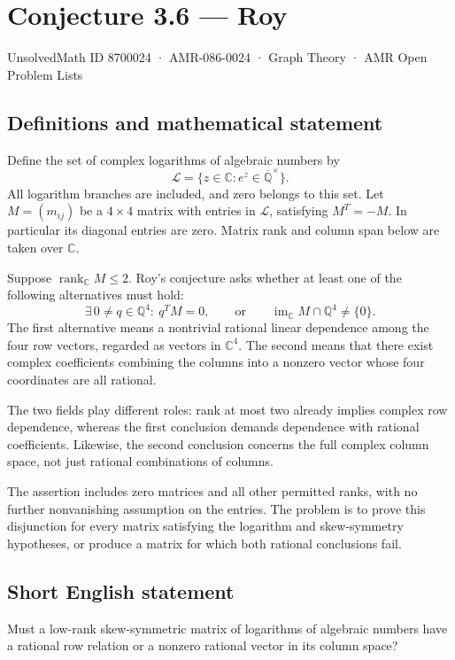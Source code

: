 \documentclass[11pt,a4paper]{article}
\begin{document}
\section*{Conjecture 3.6 — Roy}\label{8700024}
{\small UnsolvedMath ID 8700024 · AMR-086-0024 · Graph Theory · AMR Open Problem Lists}
\subsection{Definitions and mathematical statement}
Define the set of complex logarithms of algebraic numbers by
\[
\mathcal L=\{z\in\mathbb C:e^z\in\overline{\mathbb Q}^{\times}\}.
\]
All logarithm branches are included, and zero belongs to this set. Let $M=(m_{ij})$ be a $4\times4$ matrix with entries in $\mathcal L$, satisfying $M^T=-M$. In particular its diagonal entries are zero. Matrix rank and column span below are taken over $\mathbb C$.

Suppose $\operatorname{rank}_{\mathbb C}M\le2$. Roy's conjecture asks whether at least one of the following alternatives must hold:
\[
\exists\,0\ne q\in\mathbb Q^4:\ q^TM=0,
\qquad\text{or}\qquad
\operatorname{im}_{\mathbb C}M\cap\mathbb Q^4\ne\{0\}.
\]
The first alternative means a nontrivial rational linear dependence among the four row vectors, regarded as vectors in $\mathbb C^4$. The second means that there exist complex coefficients combining the columns into a nonzero vector whose four coordinates are all rational.

The two fields play different roles: rank at most two already implies complex row dependence, whereas the first conclusion demands dependence with rational coefficients. Likewise, the second conclusion concerns the full complex column space, not just rational combinations of columns.

The assertion includes zero matrices and all other permitted ranks, with no further nonvanishing assumption on the entries. The problem is to prove this disjunction for every matrix satisfying the logarithm and skew-symmetry hypotheses, or produce a matrix for which both rational conclusions fail.
\subsection{Short English statement}
Must a low-rank skew-symmetric matrix of logarithms of algebraic numbers have a rational row relation or a nonzero rational vector in its column space?
\end{document}

